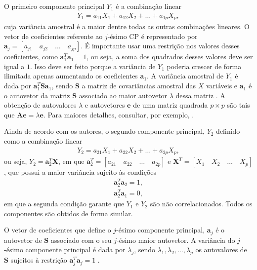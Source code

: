 \documentclass[12pt,a4paper]{article}
\begin{document}
O primeiro componente principal $Y_1$ é a combinação linear
\begin{align*}
	Y_1 = a_{11}X_1 + a_{12}X_2 + \dots + a_{1p}X_p,
\end{align*}
cuja variância amostral é a maior dentre todas as outras combinações lineares. O vetor de coeficientes referente ao $j$-ésimo CP é representado por $\boldsymbol{a}_j= [a_{j1} \quad a_{j2} \quad \dots \quad a_{jp}]$. É importante usar uma restrição nos valores desses coeficientes, como $\boldsymbol{a}_1^T\boldsymbol{a}_1 = 1$, ou seja, a soma dos quadrados desses valores deve ser igual a $1$. Isso deve ser feito porque a variância de $Y_1$ poderia crescer de forma ilimitada apenas aumentando os coeficientes $\boldsymbol{a}_1$. A variância amostral de $Y_1$ é dada por $\boldsymbol{a}_1^T\boldsymbol{S}\boldsymbol{a}_1$, sendo $\boldsymbol{S}$ a matriz de covariâncias amostral das $X$ variáveis e $\boldsymbol{a}_1$ é o autovetor da matriz $\boldsymbol{S}$ associado ao maior autovetor $\lambda$ dessa matriz \cite{everitt11}. A obtenção de autovalores $\lambda$ e autovetores $\boldsymbol{e}$ de uma matriz quadrada $p \times p$ são tais que $\boldsymbol{A}\boldsymbol{e} = \lambda\boldsymbol{e}$. Para maiores detalhes, consultar, por exemplo, \cite{ferreira11}.
	
Ainda de acordo com os autores, o segundo componente principal, $Y_2$ definido como a combinação linear
\begin{align*}
	Y_2 = a_{21}X_1 + a_{22}X_2 + \dots + a_{2p}X_p,
\end{align*}
ou seja, $Y_2 = \boldsymbol{a}_2^T\boldsymbol{X}$, em que $\boldsymbol{a}_2^T = [a_{21} \quad a_{22} \quad \dots \quad a_{2p}]$ e $\boldsymbol{X}^T = [X_{1} \quad X_{2} \quad \dots \quad X_{p}]$, que possui a maior variância sujeito às condições
\begin{align*}
	\boldsymbol{a}_2^T\boldsymbol{a}_2 = 1,\\
	\boldsymbol{a}_2^T\boldsymbol{a}_1 = 0,
\end{align*}
em que a segunda condição garante que $Y_1$ e $Y_2$ são não correlacionados. Todos os componentes são obtidos de forma similar.
	
O vetor de coeficientes que define o $j$-ésimo componente principal, $\boldsymbol{a}_j$ é o autovetor de $\boldsymbol{S}$ associado com o seu $j$-ésimo maior autovetor. A variância do $j$-ésimo componente principal é dada por $\lambda_j$, sendo  $\lambda_1, \lambda_2, \dots, \lambda_p$ os autovalores de $\boldsymbol{S}$ sujeitos à restrição $\boldsymbol{a}_j^T\boldsymbol{a}_j = 1$ \cite{everitt11}.
	
\end{document}
